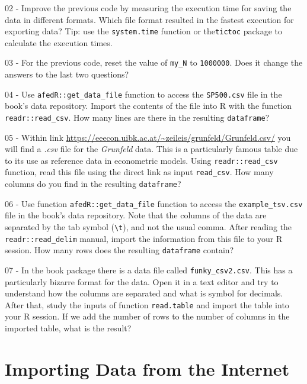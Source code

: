 \documentclass[
  12pt,
]{book}
\begin{document}
02 -
Improve the previous code by measuring the execution time for saving the data in different formats. Which file format resulted in the fastest execution for exporting data? Tip: use the \texttt{system.time} function or the\texttt{tictoc} package to calculate the execution times.

03 -
For the previous code, reset the value of \texttt{my\_N} to \texttt{1000000}. Does it change the answers to the last two questions?

04 -
Use \texttt{afedR::get\_data\_file} function to access the \texttt{SP500.csv} file in the book's data repository. Import the contents of the file into R with the function \texttt{readr::read\_csv}. How many lines are there in the resulting \texttt{dataframe}?

05 -
Within link \href{https://eeecon.uibk.ac.at/~zeileis/grunfeld/Grunfeld.csv}{https://eeecon.uibk.ac.at/\textasciitilde zeileis/grunfeld/Grunfeld.csv/} you will find a \emph{.csv} file for the \emph{Grunfeld} data. This is a particularly famous table due to its use as reference data in econometric models. Using \texttt{readr::read\_csv} function, read this file using the direct link as input \texttt{read\_csv}. How many columns do you find in the resulting \texttt{dataframe}?

06 -
Use function \texttt{afedR::get\_data\_file} function to access the \texttt{example\_tsv.csv} file in the book's data repository. Note that the columns of the data are separated by the tab symbol (\texttt{\textquotesingle{}\textbackslash{}t\textquotesingle{}}), and not the usual comma. After reading the \texttt{readr::read\_delim} manual, import the information from this file to your R session. How many rows does the resulting \texttt{dataframe} contain?

07 -
In the book package there is a data file called \texttt{\textquotesingle{}funky\_csv2.csv\textquotesingle{}}. This has a particularly bizarre format for the data. Open it in a text editor and try to understand how the columns are separated and what is symbol for decimals. After that, study the inputs of function \texttt{read.table} and import the table into your R session. If we add the number of rows to the number of columns in the imported table, what is the result?

\hypertarget{importing-internet}{%
\chapter{Importing Data from the Internet}\label{importing-internet}}
\end{document}

